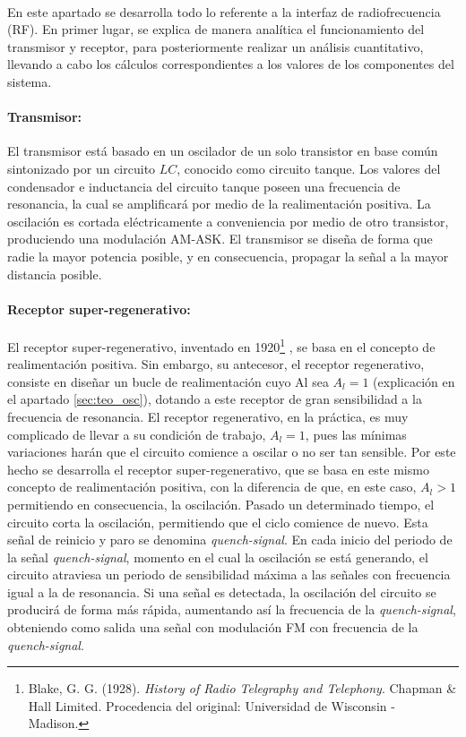 \paragraph{} En este apartado se desarrolla todo lo referente a la interfaz de radiofrecuencia (RF). En primer lugar, se explica de manera analítica el funcionamiento del transmisor y receptor, para posteriormente realizar un análisis cuantitativo, llevando a cabo los cálculos correspondientes a los valores de los componentes del sistema.

\paragraph{Transmisor:} El transmisor está basado en un oscilador de un solo transistor en base com\'un sintonizado por un circuito $LC$, conocido como circuito tanque.
Los valores del condensador e inductancia del circuito tanque poseen una frecuencia de resonancia, la cual se amplificar\'a por medio de la realimentación positiva. La oscilación es cortada eléctricamente a conveniencia por medio de otro transistor, produciendo una modulación AM-ASK. El transmisor se diseña de forma que radie la mayor potencia posible, y en consecuencia, propagar la señal a la mayor distancia posible.

\paragraph{Receptor super-regenerativo:} El receptor super-regenerativo, inventado en 1920\footnote{Blake, G. G. (1928). \textit{History of Radio Telegraphy and Telephony}. Chapman \& Hall Limited. Procedencia del original: Universidad de Wisconsin - Madison.}
, se basa en el concepto de realimentación positiva. Sin embargo, su antecesor, el receptor regenerativo, consiste en diseñar un bucle de realimentación cuyo Al sea $A_l = 1$ (explicaci\'on en el apartado \ref{sec:teo_osc}), dotando a este receptor de gran sensibilidad a la frecuencia de resonancia. 
El receptor regenerativo, en la práctica, es muy complicado de llevar a su condici\'on de trabajo, $A_l = 1$, pues las mínimas variaciones harán que el circuito comience a oscilar o no ser tan sensible. Por este hecho se desarrolla el receptor super-regenerativo, que se basa en este mismo concepto de realimentación positiva, con la diferencia de que, en este caso, $A_l > 1$ permitiendo en consecuencia, la oscilaci\'on. Pasado un determinado tiempo, el circuito corta la oscilación, permitiendo que el ciclo comience de nuevo. Esta señal de reinicio y paro se denomina \textit{quench-signal}. En cada inicio del periodo de la señal \textit{quench-signal}, momento en el cual la oscilación se está generando, el circuito atraviesa un periodo de sensibilidad máxima a las señales con frecuencia igual a la de resonancia. Si una señal es detectada, la oscilación del circuito se producirá de forma más rápida, aumentando así la frecuencia de la \textit{quench-signal}, obteniendo como salida una señal con modulación FM con frecuencia de la \textit{quench-signal}.

